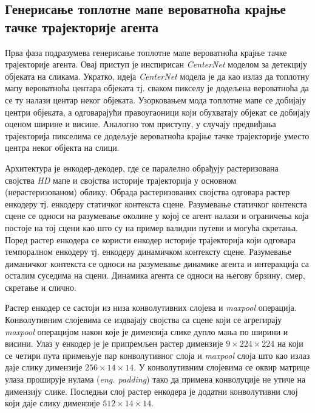 \documentclass[11pt,oneside]{memoir}
\begin{document}
\subsection{Генерисање топлотне мапе вероватноћа крајње тачке трајекторије агента}

Прва фаза подразумева генерисање топлотне мапе вероватноћа крајње тачке трајекторије агента. Овај приступ је инспирисан \textit{CenterNet} \cite{centernet}
моделом за детекцију објеката на сликама. Укратко, идеја \textit{CenterNet} модела је да као излаз да топлотну мапу вероватноћа центара објеката тј.
сваком пикселу је додељена вероватноћа да се ту налази центар неког објеката. Узорковањем мода топлотне мапе се добијају центри објеката,
а одговарајући правоугаоници који обухватају објекат се добијају оценом ширине и висине. Аналогно том приступу, у случају предвиђања
трајекторија пикселима се додељује вероватноћа крајње тачке трајекторије уместо центра неког објекта на слици. 

Архитектура је енкодер-декодер, где се паралелно обрађују растеризована својства \textit{HD} мапе и својства историје трајекторија 
у основном (нерастеризованом) облику.
Обрада растеризованих својства одговара растер енкодеру тј. енкодеру статичког контекста сцене. Разумевање статичког контекста сцене се односи
на разумевање околине у којој се агент налази и ограничења која постоје на тој сцени као што су на пример валидни путеви и могућа скретања. 
Поред растер енкодера се користи енкодер историје трајекторија који одговара темпоралном енкодеру тј. енкодеру динамичком контексту сцене. 
Разумевање диманичког контекста се односи на разумевање динамике агента и интеракција са осталим суседима на сцени. 
Динамика агента се односи на његову брзину, смер, скретање и слично. 

Растер енкодер се састоји из низа конволутивних слојева и \textit{maxpool} операција. Конволутивним слојевима се издвајају
својства са сцене који се агрегирају \textit{maxpool} операцијом након које је димензија слике дупло мања по ширини и висини. 
Улаз у енкодер је је припремљен растер димензије $9\times 224\times 224$ на који се четири пута примењује пар конволутивног слоја и \textit{maxpool}
слоја што као излаз даје слику димензије $256\times 14\times 14$. У конволутивним слојевима се оквир матрице улаза проширује нулама (\textit{eng. padding}) 
тако да примена конволуције не утиче на димензију слике. Последњи слој растер енкодера је додатни конволутивни слој који даје слику димензије
$512\times 14\times 14$. \cite{home}
\end{document}
